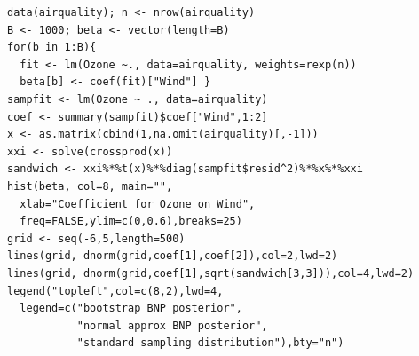 \documentclass[11pt,xcolor=svgnames]{beamer}
\newcommand{\gr}{\color{black!50}}
\newcommand{\nv}{\color{Navy}}
\newcommand{\bs}[1]{\boldsymbol{#1}}
\newcommand{\mr}[1]{\mathrm{#1}}
\newcommand{\bm}[1]{\mathbf{#1}}
\begin{document}
\begin{frame}[fragile]

{\footnotesize\nv
\begin{verbatim}
data(airquality); n <- nrow(airquality)
B <- 1000; beta <- vector(length=B)
for(b in 1:B){
  fit <- lm(Ozone ~., data=airquality, weights=rexp(n))
  beta[b] <- coef(fit)["Wind"] }
sampfit <- lm(Ozone ~ ., data=airquality)
coef <- summary(sampfit)$coef["Wind",1:2]
x <- as.matrix(cbind(1,na.omit(airquality)[,-1]))
xxi <- solve(crossprod(x))
sandwich <- xxi%*%t(x)%*%diag(sampfit$resid^2)%*%x%*%xxi
hist(beta, col=8, main="", 
  xlab="Coefficient for Ozone on Wind", 
  freq=FALSE,ylim=c(0,0.6),breaks=25)
grid <- seq(-6,5,length=500)
lines(grid, dnorm(grid,coef[1],coef[2]),col=2,lwd=2)
lines(grid, dnorm(grid,coef[1],sqrt(sandwich[3,3])),col=4,lwd=2)
legend("topleft",col=c(8,2),lwd=4, 
  legend=c("bootstrap BNP posterior",
           "normal approx BNP posterior",
           "standard sampling distribution"),bty="n")
\end{verbatim}
}

\end{frame}

\end{document}
